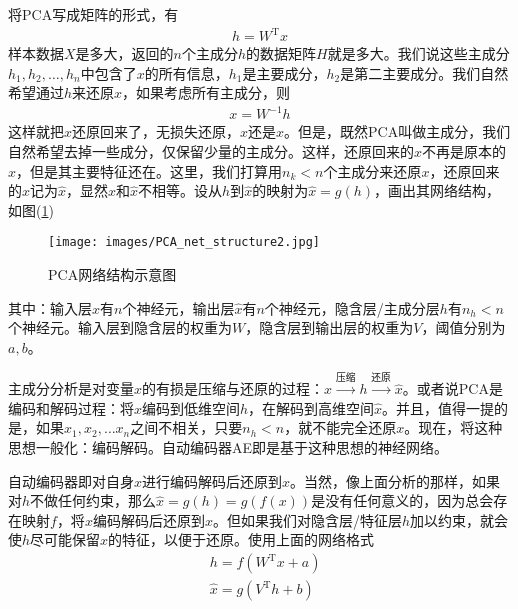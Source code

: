         \par
        将PCA写成矩阵的形式，有
        \begin{align*}
        h = W^\mathrm{T}x
        \end{align*}
        样本数据$X$是多大，返回的$n$个主成分$h$的数据矩阵$H$就是多大。我们说这些主成分$h_1,h_2,\dots,h_n$中包含了$x$的所有信息，$h_1$是主要成分，$h_2$是第二主要成分。我们自然希望通过$h$来还原$x$，如果考虑所有主成分，则
        \begin{align*}
        x = W^{-1}h
        \end{align*}
        这样就把$x$还原回来了，无损失还原，$x$还是$x$。但是，既然PCA叫做主成分，我们自然希望去掉一些成分，仅保留少量的主成分。这样，还原回来的$x$不再是原本的$x$，但是其主要特征还在。这里，我们打算用$n_k<n$个主成分来还原$x$，还原回来的$x$记为$\hat{x}$，显然$x$和$\hat{x}$不相等。设从$h$到$\hat{x}$的映射为$\hat{x} = g(h)$，画出其网络结构，如图(\ref{fig:PCA网络结构示意图2})
            \begin{figure}[H]
            \centering
            \texttt{[image: images/PCA\_net\_structure2.jpg]}
            \caption{PCA网络结构示意图}
            \label{fig:PCA网络结构示意图2}
            \end{figure}
        其中：输入层$x$有$n$个神经元，输出层$\hat{x}$有$n$个神经元，隐含层/主成分层$h$有$n_h<n$个神经元。输入层到隐含层的权重为$W$，隐含层到输出层的权重为$V$，阈值分别为$a,b$。
        \par
        主成分分析是对变量$x$的有损是压缩与还原的过程：$x\xrightarrow{\text{压缩}}h\xrightarrow{\text{还原}}\hat{x}$。或者说PCA是编码和解码过程：将$x$编码到低维空间$h$，在解码到高维空间$\hat{x}$。并且，值得一提的是，如果$x_1,x_2,\dots x_n$之间不相关，只要$n_h<n$，就不能完全还原$x$。现在，将这种思想一般化：编码解码。自动编码器AE即是基于这种思想的神经网络。
        \par
        自动编码器即对自身$x$进行编码解码后还原到$x$。当然，像上面分析的那样，如果对$h$不做任何约束，那么$\hat{x} = g(h) = g(f(x))$是没有任何意义的，因为总会存在映射$f$，将$x$编码解码后还原到$x$。但如果我们对隐含层/特征层$h$加以约束，就会使$h$尽可能保留$x$的特征，以便于还原。使用上面的网络格式
        \begin{align*}
        & h = f(W^\mathrm{T}x+a)\\
        & \hat{x} = g(V^\mathrm{T}h+b)
        \end{align*}
